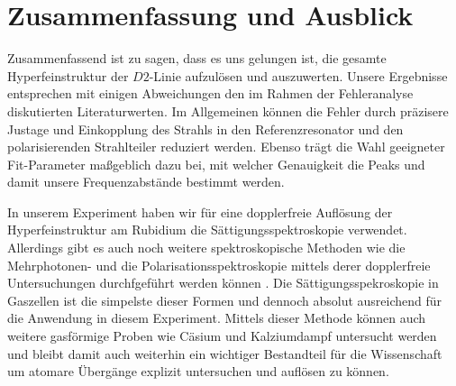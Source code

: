 \chapter{Zusammenfassung und Ausblick}
\label{chap:conclusion}

\noindent Zusammenfassend ist zu sagen, dass es uns gelungen ist, die gesamte Hyperfeinstruktur der $D2$-Linie aufzulösen und auszuwerten. Unsere Ergebnisse entsprechen mit einigen Abweichungen den im Rahmen der Fehleranalyse diskutierten Literaturwerten. Im Allgemeinen können die Fehler durch präzisere Justage und Einkopplung des Strahls in den Referenzresonator und den polarisierenden Strahlteiler reduziert werden. Ebenso trägt die Wahl geeigneter Fit-Parameter maßgeblich dazu bei, mit welcher Genauigkeit die Peaks und damit unsere Frequenzabstände bestimmt werden. 

\noindent In unserem Experiment haben wir für eine dopplerfreie Auflösung der Hyperfeinstruktur am Rubidium die Sättigungsspektroskopie verwendet. Allerdings gibt es auch noch weitere spektroskopische Methoden wie die Mehrphotonen- und die Polarisationsspektroskopie mittels derer dopplerfreie Untersuchungen durchfgeführt werden können \cite{Demt}. Die Sättigungsspekroskopie in Gaszellen ist die simpelste dieser Formen und dennoch absolut ausreichend für die Anwendung in diesem Experiment. Mittels dieser Methode können auch weitere gasförmige Proben wie Cäsium \cite{CäsSät} und Kalziumdampf \cite{KalSät} untersucht werden und bleibt damit auch weiterhin ein wichtiger Bestandteil für die Wissenschaft um atomare Übergänge explizit untersuchen und auflösen zu können. 

\cleardoublepage{}
